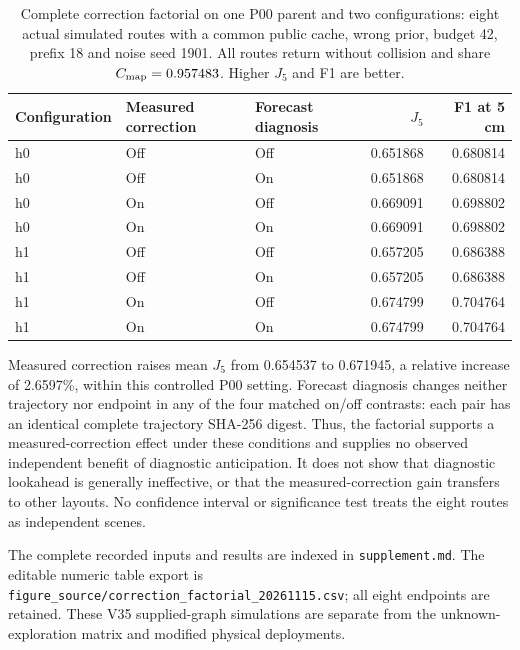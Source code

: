 \documentclass[11pt,a4paper]{article}
\begin{document}
\begin{table}[!htbp]
\caption{Complete correction factorial on one P00 parent and two configurations: eight actual simulated routes with a common public cache, wrong prior, budget 42, prefix 18 and noise seed 1901. All routes return without collision and share $C_{\rm map}=0.957483$. Higher $J_5$ and F1 are better.}
\label{tab:correction-factorial}
\centering\small\renewcommand{\arraystretch}{1.12}
\begin{tabular}{@{}lllrr@{}}
\toprule
Configuration & Measured correction & Forecast diagnosis & $J_5$ & F1 at 5 cm \\
\midrule
h0 & Off & Off & 0.651868 & 0.680814 \\
h0 & Off & On & 0.651868 & 0.680814 \\
h0 & On & Off & 0.669091 & 0.698802 \\
h0 & On & On & 0.669091 & 0.698802 \\
h1 & Off & Off & 0.657205 & 0.686388 \\
h1 & Off & On & 0.657205 & 0.686388 \\
h1 & On & Off & 0.674799 & 0.704764 \\
h1 & On & On & 0.674799 & 0.704764 \\
\bottomrule
\end{tabular}
\end{table}

Measured correction raises mean $J_5$ from 0.654537 to 0.671945, a relative increase of 2.6597\%, within this controlled P00 setting. Forecast diagnosis changes neither trajectory nor endpoint in any of the four matched on/off contrasts: each pair has an identical complete trajectory SHA-256 digest. Thus, the factorial supports a measured-correction effect under these conditions and supplies no observed independent benefit of diagnostic anticipation. It does not show that diagnostic lookahead is generally ineffective, or that the measured-correction gain transfers to other layouts. No confidence interval or significance test treats the eight routes as independent scenes.


The complete recorded inputs and results are indexed in \texttt{supplement.md}. The editable numeric table export is \texttt{figure\_source/correction\_factorial\_20261115.csv}; all eight endpoints are retained. These V35 supplied-graph simulations are separate from the unknown-exploration matrix and modified physical deployments.







\end{document}
